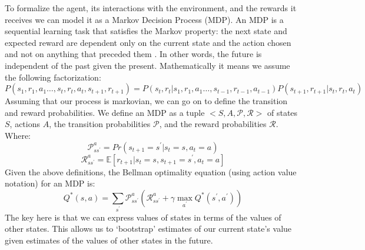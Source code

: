 \documentclass[msc, ai, twoside, notimes, logo, parskip, leftchapter, normalheadings]{infthesis}
\begin{document}
To formalize the agent, its interactions with the environment, and the rewards it receives we can model it as a Markov Decision Process (MDP). An MDP is a sequential learning task that satisfies the Markov property: the next state and expected reward are dependent only on the current state and the action chosen and not on anything that preceded them \citep{Russell-norvig}. In other words, the future is independent of the past given the present. Mathematically it means we assume the following factorization:
\begin{equation}
P(s_1, r_1, a_1 \ldots , s_t, r_t, a_t, s_{t+1}, r_{t+1}) = P(s_t, r_t | s_1, r_1, a_1 \ldots , s_{t-1}, r_{t-1}, a_{t-1}) P(s_{t+1}, r_{t+1} | s_t, r_t, a_t)
\end{equation}
Assuming that our process is markovian, we can go on to define the transition and reward probabilities. We define an MDP as a tuple \(<S,A,\mathcal{P},\mathcal{R}>\) of states \(S\), actions \(A\), the transition probabilities \(\mathcal{P}\), and the reward probabilities \(\mathcal{R}\). Where:
\begin{equation}
\mathcal{P}_{s{s^\prime}}^a = Pr(s_{t+1} = {s^\prime} | s_t = s, a_t = a)
\end{equation}
\begin{equation}
\mathcal{R}_{s{s^\prime}}^a = \mathbb{E}[r_{t+1} | s_t = s, s_{t+1} = {s^\prime}, a_t = a]
\end{equation}
Given the above definitions, the Bellman optimality equation (using action value notation) for an MDP is:
\begin{equation}
Q^*(s,a) = \sum_{s^\prime} \mathcal{P}_{s{s^\prime}}^a (\mathcal{R}_{s{s^\prime}}^a + \gamma \max_{a^\prime} Q^*({s^\prime}, {a^\prime}))
\end{equation}
The key here is that we can express values of states in terms of the values of other states. This allows us to `bootstrap' estimates of our current state's value given estimates of the values of other states in the future. 
\end{document}
